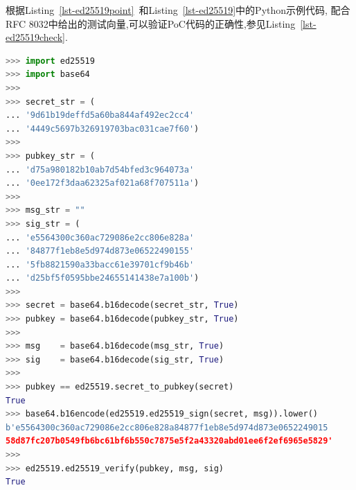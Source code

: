 

根据Listing~\ref{lst-ed25519point}~和Listing~\ref{lst-ed25519}中的Python示例代码,
配合RFC 8032中给出的测试向量,可以验证PoC代码的正确性,参见Listing~\ref{lst-ed25519check}.

\begin{lstlisting}[language=python, caption=测试向量验证Ed25519实现正确性, label=lst-ed25519check]
>>> import ed25519
>>> import base64
>>>
>>> secret_str = (
... '9d61b19deffd5a60ba844af492ec2cc4'
... '4449c5697b326919703bac031cae7f60')
>>>
>>> pubkey_str = (
... 'd75a980182b10ab7d54bfed3c964073a'
... '0ee172f3daa62325af021a68f707511a')
>>>
>>> msg_str = ""
>>> sig_str = (
... 'e5564300c360ac729086e2cc806e828a'
... '84877f1eb8e5d974d873e06522490155'
... '5fb8821590a33bacc61e39701cf9b46b'
... 'd25bf5f0595bbe24655141438e7a100b')
>>>
>>> secret = base64.b16decode(secret_str, True)
>>> pubkey = base64.b16decode(pubkey_str, True)
>>>
>>> msg    = base64.b16decode(msg_str, True)
>>> sig    = base64.b16decode(sig_str, True)
>>> 
>>> pubkey == ed25519.secret_to_pubkey(secret)
True
>>> base64.b16encode(ed25519.ed25519_sign(secret, msg)).lower()
b'e5564300c360ac729086e2cc806e828a84877f1eb8e5d974d873e0652249015
58d87fc207b0549fb6bc61bf6b550c7875e5f2a43320abd01ee6f2ef6965e5829'
>>>
>>> ed25519.ed25519_verify(pubkey, msg, sig)
True
\end{lstlisting}

\subsection{}
